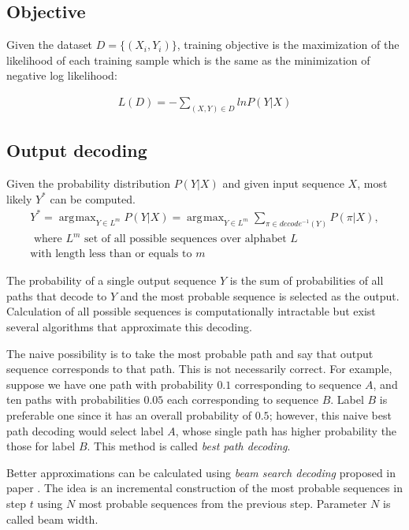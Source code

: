 \documentclass[times, utf8, diplomski, numeric, english]{fer}
\DeclareMathOperator*{\argmax}{\arg\!\max}
\begin{document}
\subsection{Objective}
Given the dataset $D = \{(X_i, Y_i)\}$, training objective is the maximization of the likelihood of each training sample  which is the same as the minimization of negative log likelihood:

\begin{equation}
\begin{gathered}
L(D) = - \sum_{(X,Y)\in D}^{} ln P(Y | X)
\end{gathered}
\end{equation}


\subsection{Output decoding}
Given the probability distribution $P(Y | X)$ and given input sequence $X$, most likely $Y^{*}$ can be computed.
\begin{equation}
\begin{gathered}
Y^{*} = \argmax_{Y \in L^m} P(Y|X) = \argmax_{Y \in L^m} \sum_{\pi \in decode^{-1}(Y)}^{} P(\pi | X),\\
\text{~where $L^m$ set of all possible sequences over alphabet $L$ }\\
\text{with length less than or equals to $m$}
\end{gathered}
\end{equation}

The probability of a single output sequence $Y$ is the sum of probabilities of all paths that decode to $Y$ and the most probable sequence is selected as the output.
Calculation of all possible sequences is computationally intractable but exist several algorithms that approximate this decoding. 

The naive possibility is to take the most probable path and say that output sequence corresponds to that path.
This is not necessarily correct.  For example, suppose we have one path with probability $0.1$ corresponding to sequence $A$, and ten paths with probabilities  $0.05$ each corresponding to sequence $B$. Label $B$ is preferable one since it has an overall probability of $0.5$; however, this naive best path decoding would select label $A$, whose single path has higher probability the those for label $B$. This method is called \textit{best path decoding}.

Better approximations can be calculated using \textit{beam search decoding} proposed in paper \cite{graves_decode}.  
The idea is an incremental construction of the most probable sequences in step $t$ using $N$ most probable sequences from the previous step. Parameter $N$ is called beam width. 
\end{document}
